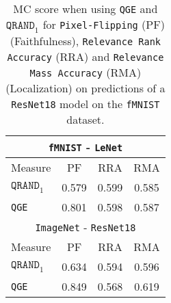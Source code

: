 \begin{table}[!t]
    \begin{center}
    \begin{small}
    \begin{sc}
    \begin{tabular}{l|c|c|c}
        \multicolumn{4}{c}{\texttt{fMNIST} - \texttt{LeNet}}\\
        \toprule
        Measure & PF & RRA & RMA\\
        \hline
        $\texttt{QRAND}_1$ & 0.579 & 0.599 & 0.585\\
        \texttt{QGE} & 0.801 & 0.598 & 0.587\\
        \hline
        \multicolumn{4}{c}{\texttt{ImageNet} - \texttt{ResNet18}}\\
        \toprule
        Measure & PF & RRA & RMA\\
        \hline
        $\texttt{QRAND}_1$ & 0.634 & 0.594 & 0.596\\
        \texttt{QGE} & 0.849 & 0.568 & 0.619\\
        \hline
    \end{tabular}
    \end{sc}
    \end{small}
    \end{center}
    \caption{MC score when using \texttt{QGE} and $\texttt{QRAND}_1$ for \texttt{Pixel-Flipping} (PF) (Faithfulness), \texttt{Relevance Rank Accuracy} (RRA) and \texttt{Relevance Mass Accuracy} (RMA) (Localization) on predictions of a \texttt{ResNet18} model on the \texttt{fMNIST} dataset.}
    \label{tab:effects_existing_measures}
\end{table}